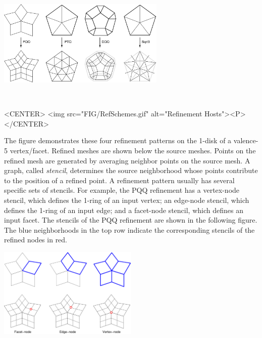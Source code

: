 \begin{ccTexOnly}
  \begin{center}
    \parbox{0.6\textwidth}{%
      \includegraphics[width=0.6\textwidth]{Subdivision_method_3/FIG/RefSchemes}%
    }\\ \vspace{0.5cm}
  \end{center}
\end{ccTexOnly}

\begin{ccHtmlOnly}
  <CENTER>
     <img src="FIG/RefSchemes.gif" alt="Refinement Hosts"><P>
  </CENTER>
\end{ccHtmlOnly}

The figure demonstrates these four refinement patterns on 
the 1-disk of a valence-5 vertex/facet.
Refined meshes are shown below the source meshes. 
Points on the refined mesh are generated by averaging
neighbor points on the source mesh. A graph, called \emph{stencil}, 
determines the source neighborhood whose points contribute to the 
position of a refined point. A refinement pattern usually has 
several specific sets of stencils.
For example, the PQQ
refinement has a vertex-node stencil, 
which defines the 1-ring of an input vertex; an edge-node stencil, 
which defines the 1-ring of an input edge; and a facet-node stencil, 
which defines an input facet. The stencils of the PQQ refinement are
shown in the following figure. The blue neighborhoods in the 
top row indicate the corresponding stencils of the refined nodes 
in red. 

\begin{ccTexOnly}
  \begin{center}
    \parbox{0.5\textwidth}{%
      \includegraphics[width=0.5\textwidth]{Subdivision_method_3/FIG/PQQStencil}%
    }\\ \vspace{0.5cm}
  \end{center}
\end{ccTexOnly}

